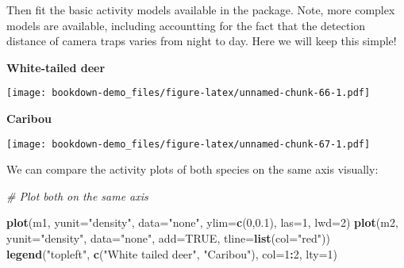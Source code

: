 \documentclass[]{book}
\newenvironment{Shaded}{\begin{snugshade}}{\end{snugshade}}
\newcommand{\KeywordTok}[1]{\textcolor[rgb]{0.13,0.29,0.53}{\textbf{#1}}}
\newcommand{\DataTypeTok}[1]{\textcolor[rgb]{0.13,0.29,0.53}{#1}}
\newcommand{\DecValTok}[1]{\textcolor[rgb]{0.00,0.00,0.81}{#1}}
\newcommand{\FloatTok}[1]{\textcolor[rgb]{0.00,0.00,0.81}{#1}}
\newcommand{\StringTok}[1]{\textcolor[rgb]{0.31,0.60,0.02}{#1}}
\newcommand{\CommentTok}[1]{\textcolor[rgb]{0.56,0.35,0.01}{\textit{#1}}}
\newcommand{\OtherTok}[1]{\textcolor[rgb]{0.56,0.35,0.01}{#1}}
\newcommand{\OperatorTok}[1]{\textcolor[rgb]{0.81,0.36,0.00}{\textbf{#1}}}
\newcommand{\NormalTok}[1]{#1}
\begin{document}
Then fit the basic activity models available in the package. Note, more
complex models are available, including accountting for the fact that
the detection distance of camera traps varies from night to day. Here we
will keep this simple!

\textbf{White-tailed deer}

\begin{Shaded}
\end{Shaded}

\texttt{[image: bookdown-demo\_files/figure-latex/unnamed-chunk-66-1.pdf]}

\textbf{Caribou}

\begin{Shaded}
\end{Shaded}

\texttt{[image: bookdown-demo\_files/figure-latex/unnamed-chunk-67-1.pdf]}

We can compare the activity plots of both species on the same axis
visually:

\begin{Shaded}
\begin{Highlighting}[]
\CommentTok{# Plot both on the same axis}

\KeywordTok{plot}\NormalTok{(m1, }\DataTypeTok{yunit=}\StringTok{"density"}\NormalTok{, }\DataTypeTok{data=}\StringTok{"none"}\NormalTok{, }\DataTypeTok{ylim=}\KeywordTok{c}\NormalTok{(}\DecValTok{0}\NormalTok{,}\FloatTok{0.1}\NormalTok{), }\DataTypeTok{las=}\DecValTok{1}\NormalTok{, }\DataTypeTok{lwd=}\DecValTok{2}\NormalTok{)}
\KeywordTok{plot}\NormalTok{(m2, }\DataTypeTok{yunit=}\StringTok{"density"}\NormalTok{, }\DataTypeTok{data=}\StringTok{"none"}\NormalTok{, }\DataTypeTok{add=}\OtherTok{TRUE}\NormalTok{, }\DataTypeTok{tline=}\KeywordTok{list}\NormalTok{(}\DataTypeTok{col=}\StringTok{"red"}\NormalTok{))}
\KeywordTok{legend}\NormalTok{(}\StringTok{"topleft"}\NormalTok{, }\KeywordTok{c}\NormalTok{(}\StringTok{"White tailed deer"}\NormalTok{, }\StringTok{"Caribou"}\NormalTok{), }\DataTypeTok{col=}\DecValTok{1}\OperatorTok{:}\DecValTok{2}\NormalTok{, }\DataTypeTok{lty=}\DecValTok{1}\NormalTok{)}
\end{Highlighting}
\end{Shaded}
\end{document}
